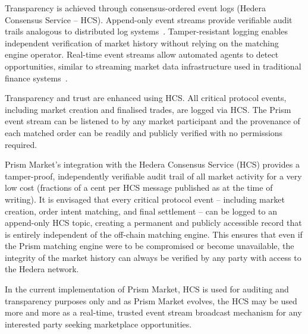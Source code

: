 \documentclass[11pt,a4paper]{article}
\begin{document}
Transparency is achieved through consensus-ordered event logs (Hedera Consensus Service -- HCS). Append-only event streams provide verifiable audit trails analogous to distributed log systems~\cite{kreps2011}. Tamper-resistant logging enables independent verification of market history without relying on the matching engine operator. Real-time event streams allow automated agents to detect opportunities, similar to streaming market data infrastructure used in traditional finance systems~\cite{kreps2011}.

Transparency and trust are enhanced using HCS. All critical protocol events, including market creation and finalised trades, are logged via HCS. The Prism event stream can be listened to by any market participant and the provenance of each matched order can be readily and publicly verified with no permissions required.



Prism Market's integration with the Hedera Consensus Service (HCS) provides a tamper-proof, independently verifiable audit trail of all market activity for a very low cost (fractions of a cent per HCS message published as at the time of writing). It is envisaged that every critical protocol event -- including market creation, order intent matching, and final settlement -- can be logged to an append-only HCS topic, creating a permanent and publicly accessible record that is entirely independent of the off-chain matching engine. This ensures that even if the Prism matching engine were to be compromised or become unavailable, the integrity of the market history can always be verified by any party with access to the Hedera network. 

In the current implementation of Prism Market, HCS is used for auditing and transparency purposes only and as Prism Market evolves, the HCS may be used more and more as a real-time, trusted event stream broadcast mechanism for any interested party seeking marketplace opportunities.
\end{document}
